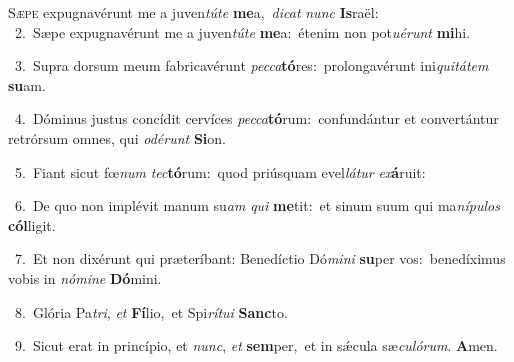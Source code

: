 \lettrine{\initial\textcolor{\initialcolor}{S}}{æpe} expugnavérunt me a juven\-\textit{tú}\-\textit{te} \textbf{me}\-a,~\star \textit{di}\-\textit{cat} \textit{nunc} \textbf{Is}\-raël:\\
{\numbfont\textcolor{\numbcolor}{~2.}}~Sæpe expugnavérunt me a juven\-\textit{tú}\-\textit{te} \textbf{me}\-a:~\star étenim non pot\-\textit{u}\-\textit{é}\textit{runt} \textbf{mi}\-hi.\par
{\numbfont\textcolor{\numbcolor}{~3.}}~Supra dorsum meum fabricavérunt \textit{pec}\-\textit{ca}\textbf{tó}res:~\star prolongavérunt ini\-\textit{qui}\-\textit{tá}\textit{tem} \textbf{su}\-am.\par
{\numbfont\textcolor{\numbcolor}{~4.}}~Dóminus justus concídit cervíces \textit{pec}\-\textit{ca}\textbf{tó}rum:~\star confundántur et convertántur retrórsum omnes, qui \textit{o}\-\textit{dé}\textit{runt} \textbf{Si}\-on.\par
{\numbfont\textcolor{\numbcolor}{~5.}}~Fiant sicut fœ\textit{num} \textit{tec}\-\textbf{tó}rum:~\star quod priúsquam evel\-\textit{lá}\-\textit{tur} \textit{ex}\-\textbf{á}ruit:\par
{\numbfont\textcolor{\numbcolor}{~6.}}~De quo non implévit manum su\textit{am} \textit{qui} \textbf{me}\-tit:~\star et sinum suum qui ma\-\textit{ní}\-\textit{pu}\textit{los} \textbf{cól}\-ligit.\par
{\numbfont\textcolor{\numbcolor}{~7.}}~Et non dixérunt qui præteríbant: Benedíctio Dó\-\textit{mi}\-\textit{ni} \textbf{su}\-per vos:~\star benedíximus vobis in \textit{nó}\-\textit{mi}\textit{ne} \textbf{Dó}\-mini.\par
{\numbfont\textcolor{\numbcolor}{~8.}}~Glória Pa\-\textit{tri}\-, \textit{et} \textbf{Fí}\-lio,~\star et Spi\-\textit{rí}\-\textit{tu}\textit{i} \textbf{Sanc}\-to.\par
{\numbfont\textcolor{\numbcolor}{~9.}}~Sicut erat in princípio, et \textit{nunc}\-, \textit{et} \textbf{sem}\-per,~\star et in sǽcula sæ\-\textit{cu}\-\textit{ló}\textit{rum}. \textbf{A}\-men.\par
